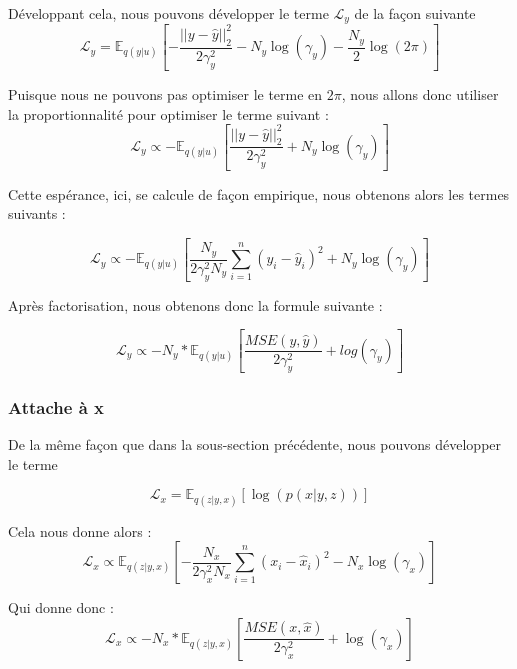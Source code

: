 \documentclass{article}
\begin{document}
Développant cela, nous pouvons développer le terme $\mathcal{L}_y$ de la façon suivante
\begin{equation*}
    \mathcal{L}_y = \mathbb{E}_{q(y|u)}\left[-\frac{||y-\hat{y}||^2_2}{2\gamma_y^2} - N_y\log(\gamma_y) - \frac{N_y}{2}\log(2\pi) \right]  
\end{equation*}

Puisque nous ne pouvons pas optimiser le terme en $2\pi$, nous allons donc utiliser la proportionnalité pour optimiser le terme suivant :
\begin{equation}
    \mathcal{L}_y \propto -\mathbb{E}_{q(y|u)}\left[\frac{||y-\hat{y}||^2_2}{2\gamma_y^2}  + N_y\log(\gamma_y)\right]
\end{equation}

Cette espérance, ici, se calcule de façon empirique, nous obtenons alors les termes suivants :

\begin{equation*}
    \mathcal{L}_y \propto -\mathbb{E}_{q(y|u)}\left[\frac{N_y}{2 \gamma_y^2N_y}\sum_{i=1}^n(y_i-\hat{y}_i)^2   + N_y\log(\gamma_y)\right]
\end{equation*}

Après factorisation, nous obtenons donc la formule suivante :

\begin{equation}
    \mathcal{L}_y \propto-N_y*\mathbb{E}_{q(y|u)}\left[\frac{MSE(y,\hat{y})}{2\gamma_y^2} + log(\gamma_y)\right]
\end{equation}

\subsubsection{Attache à x}

De la même façon que dans la sous-section précédente, nous pouvons développer le terme 

\begin{equation*}
    \mathcal{L}_x = \mathbb{E}_{q(z|y,x)}\left[\log(p(x|y,z))\right]
\end{equation*}

Cela nous donne alors :
\begin{equation*}
    \mathcal{L}_x \propto \mathbb{E}_{q(z|y,x)}\left[-\frac{N_x}{2 \gamma_x^2N_x}\sum_{i=1}^n(x_i-\hat{x}_i)^2   - N_x\log(\gamma_x)\right]
\end{equation*}

Qui donne donc :
\begin{equation*}
    \mathcal{L}_x \propto -N_x*\mathbb{E}_{q(z|y,x)}\left[\frac{MSE(x,\hat{x})}{2\gamma_x^2} + \log(\gamma_x)\right]
\end{equation*}
\end{document}
